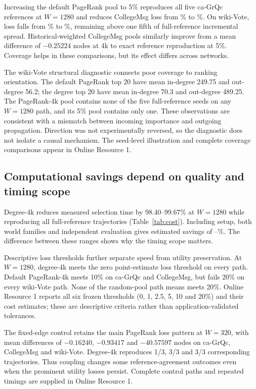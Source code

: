 \documentclass[smallextended]{svjour3}
\begin{document}
Increasing the default PageRank pool to 5\% reproduces all five ca-GrQc references at $W=1280$ and reduces CollegeMsg loss from \CollegePRLoss{}\% to \CollegePRfiveLoss{}\%. On wiki-Vote, loss falls from \WikiPRLoss{}\% to \WikiPRfiveLoss{}\%, remaining above one fifth of full-reference incremental spread. Historical-weighted CollegeMsg pools similarly improve from a mean difference of $-0.25224$ nodes at 4k to exact reference reproduction at 5\%. Coverage helps in these comparisons, but its effect differs across networks.

The wiki-Vote structural diagnostic connects poor coverage to ranking orientation. The default PageRank top 20 have mean in-degree 249.75 and out-degree 56.2; the degree top 20 have mean in-degree 70.3 and out-degree 489.25. The PageRank-4k pool contains none of the five full-reference seeds on any $W=1280$ path, and its 5\% pool contains only one. These observations are consistent with a mismatch between incoming importance and outgoing propagation. Direction was not experimentally reversed, so the diagnostic does not isolate a causal mechanism. The seed-level illustration and complete coverage comparisons appear in Online Resource 1.

\subsection{Computational savings depend on quality and timing scope}
Degree-4k reduces measured selection time by 98.40--99.67\% at $W=1280$ while reproducing all full-reference trajectories (Table~\ref{tab:cost}). Including setup, both world families and independent evaluation gives estimated savings of \CollegeDegreeSaving{}--\WikiDegreeSaving{}\%. The difference between these ranges shows why the timing scope matters.


Descriptive loss thresholds further separate speed from utility preservation. At $W=1280$, degree-4k meets the zero point-estimate loss threshold on every path. Default PageRank-4k meets 10\% on ca-GrQc and CollegeMsg, but fails 20\% on every wiki-Vote path. None of the random-pool path means meets 20\%. Online Resource 1 reports all six frozen thresholds (0, 1, 2.5, 5, 10 and 20\%) and their cost estimates; these are descriptive criteria rather than application-validated tolerances.

The fixed-edge control retains the main PageRank loss pattern at $W=320$, with mean differences of $-0.16240$, $-0.93417$ and $-40.57597$ nodes on ca-GrQc, CollegeMsg and wiki-Vote. Degree-4k reproduces 1/3, 3/3 and 3/3 corresponding trajectories. Thus coupling changes some reference-agreement outcomes even when the prominent utility losses persist. Complete control paths and repeated timings are supplied in Online Resource 1.
\end{document}
